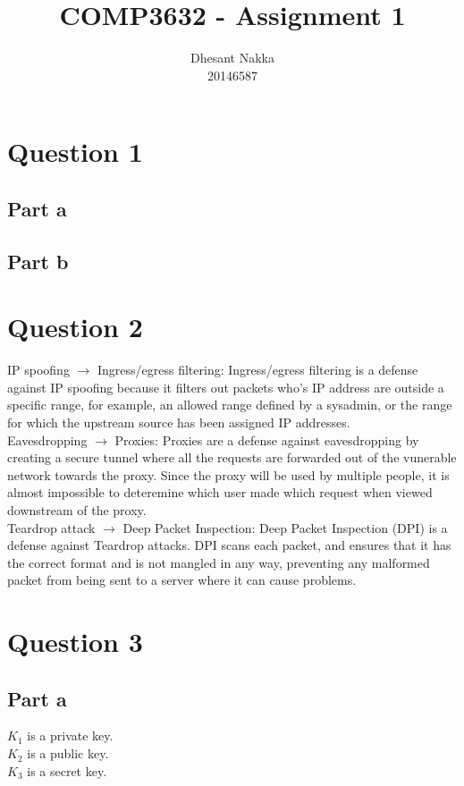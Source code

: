 \documentclass[12pt,a4paper]{article}
\title{COMP3632 - Assignment 1}
\author{Dhesant Nakka\\20146587}
\begin{document}
\maketitle

\section{Question 1}
\subsection{Part a}
\subsection{Part b}

\section{Question 2}
IP spoofing \(\rightarrow\) Ingress/egress filtering: Ingress/egress filtering is a defense against IP spoofing because it filters out packets who's IP address are outside a specific range, for example, an allowed range defined by a sysadmin, or the range for which the upstream source has been assigned IP addresses.\\
Eavesdropping \(\rightarrow\) Proxies: Proxies are a defense against eavesdropping by creating a secure tunnel where all the requests are forwarded out of the vunerable network towards the proxy. Since the proxy will be used by multiple people, it is almost impossible to deteremine which user made which request when viewed downstream of the proxy.\\
Teardrop attack \(\rightarrow\) Deep Packet Inspection: Deep Packet Inspection (DPI) is a defense against Teardrop attacks. DPI scans each packet, and ensures that it has the correct format and is not mangled in any way, preventing any malformed packet from being sent to a server where it can cause problems.

\section{Question 3}
\subsection{Part a}
\(K_1\) is a private key.\\
\(K_2\) is a public key.\\
\(K_3\) is a secret key.
\end{document}
